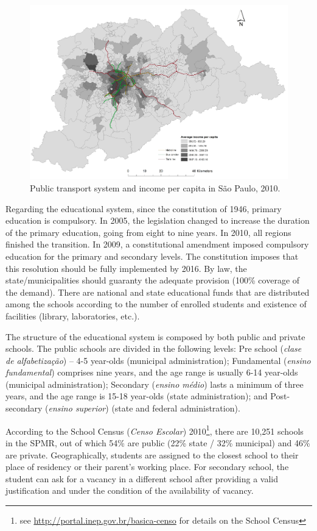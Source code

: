\documentclass[]{article}
\let\rmarkdownfootnote\footnote%
\def\footnote{\protect\rmarkdownfootnote}
\begin{document}
\begin{figure}
\includegraphics[width=0.8\linewidth]{income_pc} \caption{Public transport system and income per capita in São Paulo, 2010.}\label{fig:inc-trans}
\end{figure}

Regarding the educational system, since the constitution of 1946,
primary education is compulsory. In 2005, the legislation changed to
increase the duration of the primary education, going from eight to nine
years. In 2010, all regions finished the transition. In 2009, a
constitutional amendment imposed compulsory education for the primary
and secondary levels. The constitution imposes that this resolution
should be fully implemented by 2016. By law, the state/municipalities
should guaranty the adequate provision (100\% coverage of the demand).
There are national and state educational funds that are distributed
among the schools according to the number of enrolled students and
existence of facilities (library, laboratories, etc.).

The structure of the educational system is composed by both public and
private schools. The public schools are divided in the following levels:
Pre school (\textit{clase de alfabetização}) -- 4-5 year-olds (municipal
administration); Fundamental (\textit{ensino fundamental}) comprises
nine years, and the age range is usually 6-14 year-olds (municipal
administration); Secondary (\textit{ensino médio}) lasts a minimum of
three years, and the age range is 15-18 year-olds (state
administration); and Post-secondary (\textit{ensino superior}) (state
and federal administration).

According to the School Census (\textit{Censo Escolar}) 2010\footnote{see
  \url{http://portal.inep.gov.br/basica-censo} for details on the School
  Census}, there are 10,251 schools in the SPMR, out of which 54\% are
public (22\% state / 32\% municipal) and 46\% are private.
Geographically, students are assigned to the closest school to their
place of residency or their parent's working place. For secondary
school, the student can ask for a vacancy in a different school after
providing a valid justification and under the condition of the
availability of vacancy.
\end{document}
